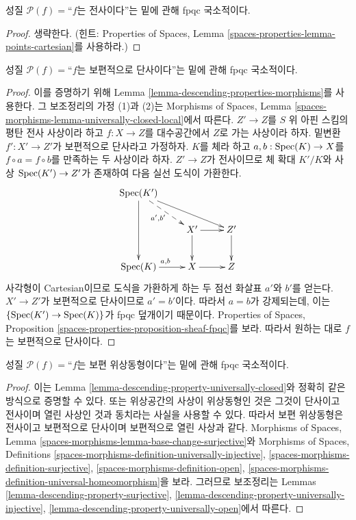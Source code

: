 \begin{lemma}
\label{lemma-descending-property-surjective}
성질 $\mathcal{P}(f)=$``$f$는 전사이다''는 밑에 관해 fpqc 국소적이다.
\end{lemma}

\begin{proof}
생략한다. (힌트: Properties of Spaces, Lemma
\ref{spaces-properties-lemma-points-cartesian}를 사용하라.)
\end{proof}

\begin{lemma}
\label{lemma-descending-property-universally-injective}
성질 $\mathcal{P}(f)=$``$f$는 보편적으로 단사이다''는 밑에 관해 fpqc
국소적이다.
\end{lemma}

\begin{proof}
이를 증명하기 위해 Lemma \ref{lemma-descending-properties-morphisms}를
사용한다. 그 보조정리의 가정 (1)과 (2)는 Morphisms of Spaces, Lemma
\ref{spaces-morphisms-lemma-universally-closed-local}에서 따른다.
$Z'\to Z$를 $S$ 위 아핀 스킴의 평탄 전사 사상이라 하고
$f:X\to Z$를 대수공간에서 $Z$로 가는 사상이라 하자. 밑변환
$f':X'\to Z'$가 보편적으로 단사라고 가정하자. $K$를 체라 하고
$a,b:\mathop{\mathrm{Spec}}(K)\to X$를 $f\circ a=f\circ b$를 만족하는 두 사상이라
하자. $Z'\to Z$가 전사이므로 체 확대 $K'/K$와 사상
$\mathop{\mathrm{Spec}}(K')\to Z'$가 존재하여 다음 실선 도식이 가환한다.
$$
\xymatrix{
\Spec(K') \ar[rrd] \ar@{-->}[rd]_{a', b'} \ar[dd] \\
 &
X' \ar[r] \ar[d] &
Z' \ar[d] \\
\Spec(K) \ar[r]^{a, b} &
X \ar[r] &
Z
}
$$
사각형이 Cartesian이므로 도식을 가환하게 하는 두 점선 화살표 $a'$와
$b'$를 얻는다. $X'\to Z'$가 보편적으로 단사이므로 $a'=b'$이다. 따라서
$a=b$가 강제되는데, 이는 $\{\mathop{\mathrm{Spec}}(K')\to\mathop{\mathrm{Spec}}(K)\}$가 fpqc 덮개이기
때문이다.
Properties of Spaces, Proposition
\ref{spaces-properties-proposition-sheaf-fpqc}를 보라. 따라서 원하는 대로
$f$는 보편적으로 단사이다.
\end{proof}

\begin{lemma}
\label{lemma-descending-property-universal-homeomorphism}
성질 $\mathcal{P}(f)=$``$f$는 보편 위상동형이다''는 밑에 관해 fpqc
국소적이다.
\end{lemma}

\begin{proof}
이는 Lemma \ref{lemma-descending-property-universally-closed}와 정확히 같은
방식으로 증명할 수 있다. 또는 위상공간의 사상이 위상동형인 것은 그것이
단사이고 전사이며 열린 사상인 것과 동치라는 사실을 사용할 수 있다.
따라서 보편 위상동형은 전사이고 보편적으로 단사이며 보편적으로 열린
사상과 같다. Morphisms of Spaces, Lemma
\ref{spaces-morphisms-lemma-base-change-surjective}와 Morphisms of Spaces,
Definitions \ref{spaces-morphisms-definition-universally-injective},
\ref{spaces-morphisms-definition-surjective},
\ref{spaces-morphisms-definition-open},
\ref{spaces-morphisms-definition-universal-homeomorphism}을 보라. 그러므로
보조정리는 Lemmas \ref{lemma-descending-property-surjective},
\ref{lemma-descending-property-universally-injective},
\ref{lemma-descending-property-universally-open}에서 따른다.
\end{proof}

